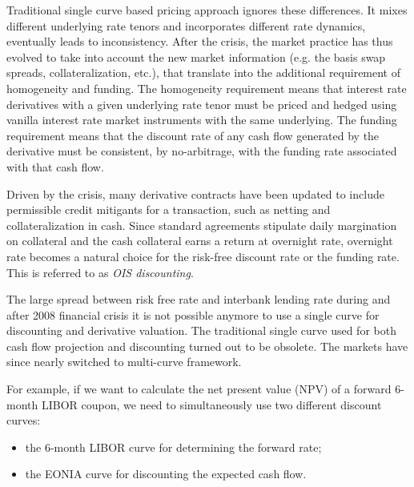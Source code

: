 Traditional single curve based pricing approach ignores these differences. It mixes different underlying rate tenors and incorporates different rate dynamics, eventually leads to inconsistency.
After the crisis, the market practice has thus evolved to take into account the new market information (e.g. the basis swap spreads, collateralization, etc.), that translate into the additional requirement of homogeneity and funding. The homogeneity requirement means that interest rate derivatives with a given underlying rate tenor must be priced and hedged using vanilla interest rate market instruments with the same underlying. The funding requirement means that the discount rate of any cash flow generated by the derivative must be consistent, by no-arbitrage, with the funding rate associated with that cash flow. 

Driven by the crisis, many derivative contracts have been updated to include permissible credit mitigants for a transaction, such as netting and collateralization in cash. Since standard agreements stipulate daily margination on collateral and the cash collateral earns a return at overnight rate, overnight rate becomes a natural choice for the risk-free discount rate or the funding rate. This is referred to as \emph{OIS discounting}.

The large spread between risk free rate and interbank lending rate during and after 2008 financial crisis it is not possible anymore to use a single curve for discounting and derivative valuation. The traditional single curve used for both  cash flow projection and discounting turned out to be obsolete. The markets have since nearly switched to multi-curve framework. 

For example, if we want to calculate the net present value (NPV) of a forward 6-month LIBOR coupon, we need to simultaneously use two different discount curves: 

\begin{itemize}
\tightlist
\item the 6-month LIBOR curve for determining the forward rate;
\item the EONIA curve for discounting the expected cash flow.
\end{itemize}


